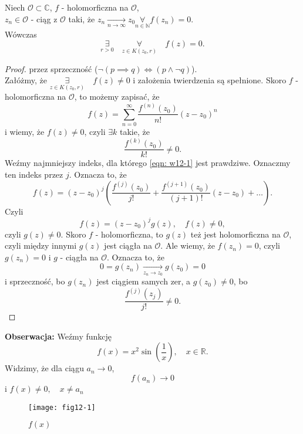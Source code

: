 \documentclass[../main.tex]{subfiles}
\begin{document}
\begin{tw}
    Niech $\mathcal{O}\subset\mathbb{C}$, $f$ - holomorficzna na $\mathcal{O}$,\\
    $z_n\in\mathcal{O}$ - ciąg z $\mathcal{O}$ taki, że $z_n \underset{n\to \infty}{\longrightarrow}z_0 \underset{n\in \mathbb{N}}{\forall} f(z_n) = 0$.\\
    Wówczas
    \[
        \underset{r > 0}{\exists}\quad \underset{z\in K(z_0, r)}{\forall} \quad f(z) = 0
    .\]
\end{tw}
\begin{proof}
    przez sprzeczność ($\lnot(p\implies q) \iff (p \land \lnot q)$).\\
    Załóżmy, że $\underset{z\in K(z_0, r)}{\exists}\quad f(z) \neq 0$ i założenia twierdzenia są spełnione. Skoro $f$ - holomorficzna na $\mathcal{O}$, to możemy zapisać, że
    \[
        f(z) = \sum_{n = 0}^\infty \frac{f^{(n)}(z_0)}{n!} (z-z_0)^n
    \]
    i wiemy, że $f(z) \neq 0$, czyli $\exists k$ takie, że
    \begin{equation}
        \label{eqn: w12-1}
        \frac{f^{(k)}(z_0)}{k!} \neq 0 \tag{$\star$}
    .\end{equation}
    Weźmy najmniejszy indeks, dla którego \eqref{eqn: w12-1} jest prawdziwe. Oznaczmy ten indeks przez $j$. Oznacza to, że
    \[
        f(z) = (z - z_0)^j\left( \frac{f^{(j)}(z_0)}{j!} + \frac{f^{(j+1)}(z_0)}{(j+1)!} (z-z_0) + \dots\right)
    .\]
Czyli
    \[
        f(z) = (z-z_0)^j g(z),\quad f(z) \neq 0
    ,\]
czyli $g(z) \neq 0$. Skoro $f$ - holomorficzna, to $g(z)$ też jest holomorficzna na $\mathcal{O}$, czyli między innymi $g(z)$ jest ciągła na $\mathcal{O}$. Ale wiemy, że $f(z_n) = 0$, czyli $g(z_n) = 0$ i $g$ - ciągła na $\mathcal{O}$. Oznacza to, że
    \[
        0 = g(z_n) \underset{z_n\to z_0}{\longrightarrow} g(z_0) = 0
    \]
    i sprzeczność, bo $g(z_n)$ jest ciągiem samych zer, a $g(z_0) \neq 0$, bo
    \[
        \frac{f^{(j)}(z_j)}{j!} \neq 0
    .\]
\end{proof}
\textbf{Obserwacja: } Weźmy funkcję
\[
    f(x) = x^2 \sin\left(\frac{1}{x}\right),\quad x\in \mathbb{R}
.\]
Widzimy, że dla ciągu $a_n \to 0$,
\[
    f(a_n) \longrightarrow 0
\]
i $f(x) \neq 0,\quad x\neq a_n$
\begin{figure}[h]
    \center
    \texttt{[image: fig12-1]}
    \caption{$f(x)$}
\end{figure}
\end{document}
